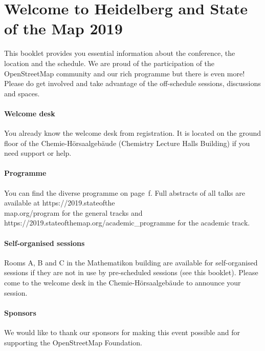 \newpage
\enlargethispage{1\baselineskip}
\section*{Welcome to Heidelberg and State of the Map 2019} \label{welcome}
This booklet provides you essential information
about the conference, the location and the schedule.  We are proud of the participation of the
OpenStreetMap community and our rich programme but there is even more!  Please do get involved and
take advantage of the off-schedule sessions, discussions and spaces.

\paragraph*{Welcome desk} \label{welcome-helpdesk}
You already know the welcome desk from registration. It is located on the ground floor of the Chemie-Hörsaalgebäude (Chemistry
Lecture Halls Building) if you need support or help.

\paragraph*{Programme}
You can find the diverse programme on page~\pageref{saturday}f. Full abstracts of all talks are
available at https://2019.stateofthe\\map.org/program for the general tracks and
https://2019.stateofthemap.org/academic\_programme for the academic track.

\paragraph*{Self-organised sessions} \label{welcome-location}
Rooms A, B and C in the Mathematikon building are available for self-organised sessions if they are not in use by pre-scheduled sessions (see this booklet). Please come to the welcome desk in the Chemie-Hörsaalgebäude to announce your session.

\paragraph*{Sponsors} \label{welcome-sponsors}
We would like to thank our sponsors for making this event possible and for supporting the 
OpenStreetMap Foundation.
\newpage
